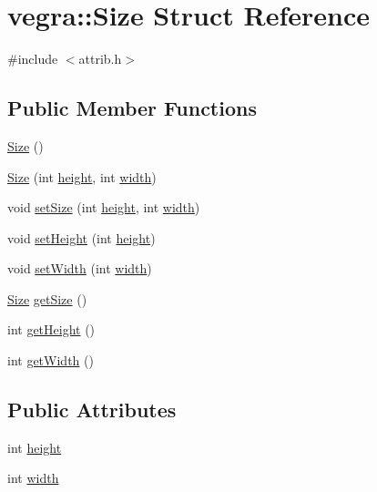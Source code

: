 \hypertarget{structvegra_1_1Size}{}\section{vegra\+:\+:Size Struct Reference}
\label{structvegra_1_1Size}


{\ttfamily \#include $<$attrib.\+h$>$}

\subsection*{Public Member Functions}
\begin{DoxyCompactItemize}
\item 
\mbox{\hyperlink{structvegra_1_1Size_a6d5058f3d438e24fca92f3c261ecd7a8}{Size}} ()
\item 
\mbox{\hyperlink{structvegra_1_1Size_af92638bf9795f8c562cc7424f212e985}{Size}} (int \mbox{\hyperlink{structvegra_1_1Size_ab88c99e72a1579a2ac00f10133c5f23d}{height}}, int \mbox{\hyperlink{structvegra_1_1Size_ae71295e2c36b57cb0a71e4c4974ec753}{width}})
\item 
void \mbox{\hyperlink{structvegra_1_1Size_a7788fabbf4bc7ad2b23f5b4b113983a8}{set\+Size}} (int \mbox{\hyperlink{structvegra_1_1Size_ab88c99e72a1579a2ac00f10133c5f23d}{height}}, int \mbox{\hyperlink{structvegra_1_1Size_ae71295e2c36b57cb0a71e4c4974ec753}{width}})
\item 
void \mbox{\hyperlink{structvegra_1_1Size_a92f779e3bcaae71cc2f80d3a87506a30}{set\+Height}} (int \mbox{\hyperlink{structvegra_1_1Size_ab88c99e72a1579a2ac00f10133c5f23d}{height}})
\item 
void \mbox{\hyperlink{structvegra_1_1Size_a916716ce017fced6ec41612142289798}{set\+Width}} (int \mbox{\hyperlink{structvegra_1_1Size_ae71295e2c36b57cb0a71e4c4974ec753}{width}})
\item 
\mbox{\hyperlink{structvegra_1_1Size}{Size}} \mbox{\hyperlink{structvegra_1_1Size_afe0b7cbe050d2419ca8bc59880be8799}{get\+Size}} ()
\item 
int \mbox{\hyperlink{structvegra_1_1Size_a58e78996257b9b625babb0c217767759}{get\+Height}} ()
\item 
int \mbox{\hyperlink{structvegra_1_1Size_af565490734a7ef2975c1e359e44c4a9e}{get\+Width}} ()
\end{DoxyCompactItemize}
\subsection*{Public Attributes}
\begin{DoxyCompactItemize}
\item 
int \mbox{\hyperlink{structvegra_1_1Size_ab88c99e72a1579a2ac00f10133c5f23d}{height}}
\item 
int \mbox{\hyperlink{structvegra_1_1Size_ae71295e2c36b57cb0a71e4c4974ec753}{width}}
\end{DoxyCompactItemize}


